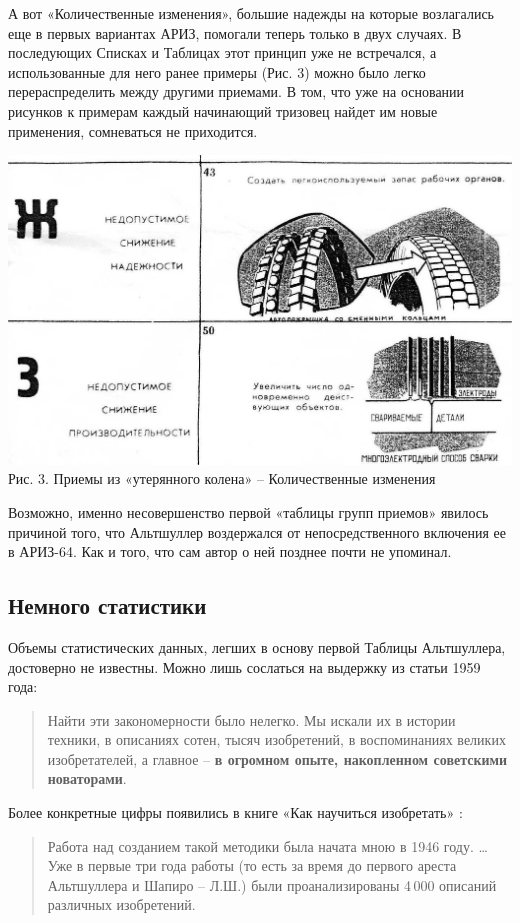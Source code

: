 \documentclass[11pt,a4paper]{article}
\begin{document}
А вот «Количественные изменения», большие надежды на которые возлагались еще в
первых вариантах АРИЗ, помогали теперь только в двух случаях. В последующих
Списках и Таблицах этот принцип уже не встречался, а использованные для него
ранее примеры (Рис. 3) можно было легко перераспределить между другими
приемами. В том, что уже на основании рисунков к примерам каждый начинающий
тризовец найдет им новые применения, сомневаться не приходится.
\begin{center}
  \includegraphics[width=.8\textwidth]{./18.jpg}\\
  Рис. 3. Приемы из «утерянного колена» -- Количественные изменения
\end{center}

Возможно, именно несовершенство первой «таблицы групп приемов» явилось
причиной того, что Альтшуллер воздержался от непосредственного включения ее в
АРИЗ-64.  Как и того, что сам автор о ней позднее почти не упоминал.

\subsection*{Немного статистики}

Объемы статистических данных, легших в основу первой Таблицы Альтшуллера,
достоверно не известны. Можно лишь сослаться на выдержку из статьи 1959 года:
\begin{quote}  
  Найти эти закономерности было нелегко. Мы искали их в истории техники, в
  описаниях сотен, тысяч изобретений, в воспоминаниях великих изобретателей, а
  главное -- \textbf{в огромном опыте, накопленном советскими новаторами}.
  \cite{Altshuller1959}
\end{quote}
Более конкретные цифры появились в книге «Как научиться изобретать»
\cite{Altshuller1961}: 
\begin{quote}
  Работа над созданием такой методики была начата мною в 1946 году. …  Уже в
  первые три года работы (то есть за время до первого ареста Альтшуллера и
  Шапиро -- Л.Ш.) были проанализированы 4\,000 описаний различных изобретений.
\end{quote}
\end{document}
